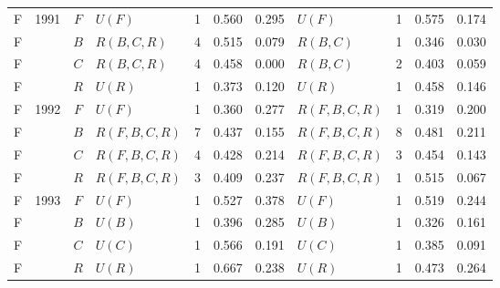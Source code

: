 \documentclass[fleqn,usenatbib]{mnras}
\begin{document}
\begin{minipage}{\textwidth}
\begin{tabular}{ccclrrrlrrr}
F & 1991 & $F$ & $U(F)$ & 1 & 0.560 & 0.295 & $U(F)$ & 1 & 0.575 & 0.174 \\
F &  & $B$ & $R(B,C,R)$ & 4 & 0.515 & 0.079 & $R(B,C)$ & 1 & 0.346 & 0.030 \\
F &  & $C$ & $R(B,C,R)$ & 4 & 0.458 & 0.000 & $R(B,C)$ & 2 & 0.403 & 0.059 \\
F &  & $R$ & $U(R)$ & 1 & 0.373 & 0.120 & $U(R)$ & 1 & 0.458 & 0.146 \\
\addlinespace[2pt]
F & 1992 & $F$ & $U(F)$ & 1 & 0.360 & 0.277 & $R(F,B,C,R)$ & 1 & 0.319 & 0.200 \\
F &  & $B$ & $R(F,B,C,R)$ & 7 & 0.437 & 0.155 & $R(F,B,C,R)$ & 8 & 0.481 & 0.211 \\
F &  & $C$ & $R(F,B,C,R)$ & 4 & 0.428 & 0.214 & $R(F,B,C,R)$ & 3 & 0.454 & 0.143 \\
F &  & $R$ & $R(F,B,C,R)$ & 3 & 0.409 & 0.237 & $R(F,B,C,R)$ & 1 & 0.515 & 0.067 \\
\addlinespace[2pt]
F & 1993 & $F$ & $U(F)$ & 1 & 0.527 & 0.378 & $U(F)$ & 1 & 0.519 & 0.244 \\
F &  & $B$ & $U(B)$ & 1 & 0.396 & 0.285 & $U(B)$ & 1 & 0.326 & 0.161 \\
F &  & $C$ & $U(C)$ & 1 & 0.566 & 0.191 & $U(C)$ & 1 & 0.385 & 0.091 \\
F &  & $R$ & $U(R)$ & 1 & 0.667 & 0.238 & $U(R)$ & 1 & 0.473 & 0.264 \\
\bottomrule
\end{tabular}
\end{minipage}

\label{lastpage}
\end{document}
